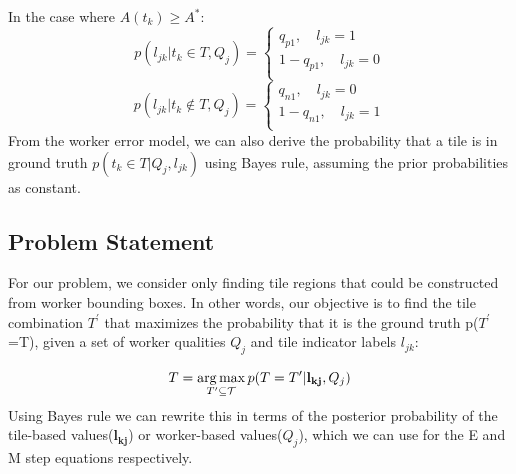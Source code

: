 {\begin{enumerate}
In the case where $A(t_k)\geq A^*$: 
\begin{equation}
p(l_{jk}|t_k\in T,Q_j) = \begin{cases}
               q_{p1}, \quad l_{jk}=1  \\
               1-q_{p1}, \quad l_{jk}=0  \\
            \end{cases}
\end{equation}
\begin{equation}
p(l_{jk}|t_k\notin T,Q_j) = \begin{cases}
               q_{n1}, \quad l_{jk}=0  \\
               1-q_{n1}, \quad l_{jk}=1  \\
            \end{cases}
\end{equation}
From the worker error model, we can also derive the probability that a tile is in ground truth $p(t_k\in T|Q_j, l_{jk})$ using Bayes rule, assuming the prior probabilities as constant.
\end{enumerate}

\subsection{Problem Statement}
\par For our problem, we consider only finding tile regions that could be constructed from worker bounding boxes. In other words, our objective is to find the tile combination $T^\prime$ that maximizes the probability that it is the ground truth p($T^\prime$=T), given a set of worker qualities $Q_j$ and tile indicator labels $l_{jk}$: 

\begin{equation}
T = \operatorname*{arg\,max}_{T^\prime \subseteq \mathcal{T}}p(T=T^\prime |  \mathbf{l_{kj}},Q_j)
\label{objective}
\end{equation}
Using Bayes rule we can rewrite this in terms of the posterior probability of the tile-based values($\mathbf{l_{kj}}$) or worker-based values($Q_{j}$), which we can use for the E and M step equations respectively. 
}
